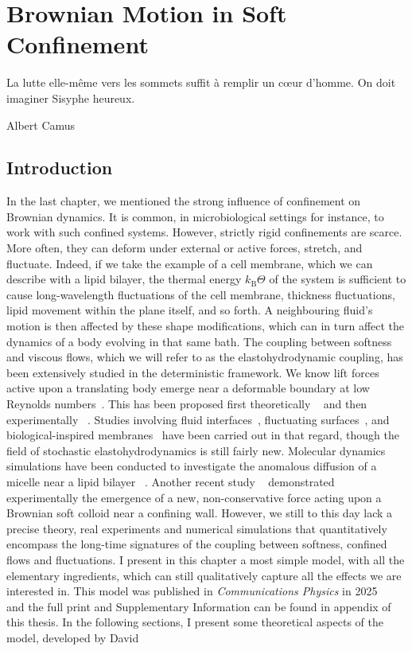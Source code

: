 \chapter{Brownian Motion in Soft Confinement}

\epigraph{La lutte elle-même vers les sommets suffit à remplir un cœur d'homme. On doit imaginer Sisyphe heureux.}{Albert Camus}
\section{Introduction}

In the last chapter, we mentioned the strong influence of confinement on Brownian dynamics. It is common, in microbiological settings for instance, to work with such confined systems. However, strictly rigid confinements are scarce. More often, they can deform under external or active forces, stretch, and fluctuate. Indeed, if we take the example of a cell membrane, which we can describe with a lipid bilayer, the thermal energy $k_\mathrm{B}\Theta$ of the system is sufficient to cause long-wavelength fluctuations of the cell membrane, thickness fluctuations, lipid movement within the plane itself, and so forth. A neighbouring fluid's motion is then affected by these shape modifications, which can in turn affect the dynamics of a body evolving in that same bath. The coupling between softness and viscous flows, which we will refer to as the elastohydrodynamic coupling, has been extensively studied in the deterministic framework. We know lift forces active upon a translating body emerge near a deformable boundary at low Reynolds numbers~\cite{Bureau2023Lift}. This has been proposed first theoretically ~\cite{sekimoto1993mechanism, urzay_elastohydrodynamic_2007, Beaucourt2004, skotheim_soft_2004, Snoeijer2013, } and then experimentally ~\cite{Saintyves2016, Davies2018, Rallabandi2018, Vialar2019, zhang2020direct}. Studies involving fluid interfaces~\cite{Bickel2006Brownian,Wang2009}, fluctuating surfaces~\cite{Villa2023Microparticle,Marbach2018Transport}, and biological-inspired membranes~\cite{Sarfati2021Enhanced,DaddiMoussaIder2016Particle,Sheikh2023Brownian} have been carried out in that regard, though the field of stochastic elastohydrodynamics is still fairly new. Molecular dynamics simulations have been conducted to investigate the anomalous diffusion of a micelle near a lipid bilayer ~\cite{Sheikh2023}. Another recent study ~\cite{fares_observation_2024} demonstrated experimentally the emergence of a new, non-conservative force acting upon a Brownian soft colloid near a confining wall. However, we still to this day lack a precise theory, real experiments and numerical simulations that quantitatively encompass the long-time signatures of the coupling between softness, confined flows and fluctuations. I present in this chapter a most simple model, with all the elementary ingredients, which can still qualitatively capture all the effects we are interested in. This model was published in \emph{Communications Physics} in 2025 ~\cite{lacherez_enhanced_2025} and the full print and Supplementary Information can be found in appendix of this thesis. In the following sections, I present some theoretical aspects of the model, developed by David 